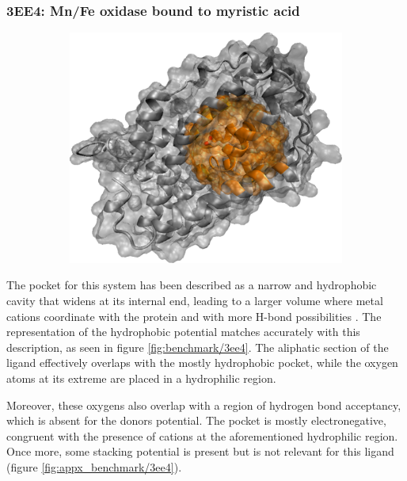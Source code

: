     \subsubsection{3EE4: Mn/Fe oxidase bound to myristic acid}
      \begin{figure}[H] \centering
        \begin{subfigure}[c]{0.3\textwidth} \centering
          \includegraphics[width=1\textwidth]{figures/results/ps_prot/3ee4.png}
        \end{subfigure}
        \begin{subfigure}[c]{0.3\textwidth} \centering
        \end{subfigure}
      \end{figure}

      The pocket for this system has been described as a narrow and hydrophobic cavity that widens at its internal end, leading to a larger volume where metal cations coordinate with the protein and with more H-bond possibilities \cite{benchmark_hydrophobic_2009}. The representation of the hydrophobic potential matches accurately with this description, as seen in figure \ref{fig:benchmark/3ee4}. The aliphatic section of the ligand effectively overlaps with the mostly hydrophobic pocket, while the oxygen atoms at its extreme are placed in a hydrophilic region.

      Moreover, these oxygens also overlap with a region of hydrogen bond acceptancy, which is absent for the donors potential. The pocket is mostly electronegative, congruent with the presence of cations at the aforementioned hydrophilic region. Once more, some stacking potential is present but is not relevant for this ligand (figure \ref{fig:appx_benchmark/3ee4}).

